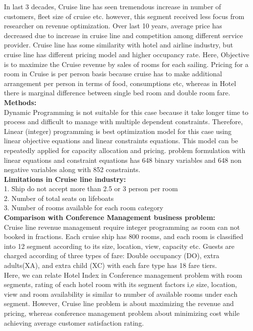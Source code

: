 \documentclass[paper=a4, fontsize=11pt]{scrartcl} %
\begin{document}
In last 3 decades, Cruise line has seen tremendous increase in number of customers, fleet size of cruise etc. however, this segment received less focus from researcher on revenue optimization. Over last 10 years, average price has decreased due to increase in cruise line and competition among different service provider. Cruise line has some similarity with hotel and airline industry, but cruise line has different pricing model and higher occupancy rate. Here, Objective is to maximize the Cruise revenue by sales of rooms for each sailing. Pricing for a room in Cruise is per person basis because cruise has to make additional arrangement per person in terms of food, consumptions etc, whereas in Hotel there is marginal difference between single bed room and double room fare. \\

\textbf{Methods:}\\
Dynamic Programming is not suitable for this case because it take longer time to process and difficult to manage with multiple dependent constraints. Therefore, Linear (integer) programming is best optimization model for this case using linear objective equations and linear constraints equations. This model can be repeatedly applied for capacity allocation and pricing. problem formulation with linear equations and constraint equations has 648 binary variables and 648 non negative variables along with 852 constraints.\\

\textbf{Limitations in Cruise line industry:}\\
1. Ship do not accept more than 2.5 or 3 person per room\\
2. Number of total seats on lifeboats\\
3. Number of rooms available for each room category\\

\textbf{Comparison with Conference Management business problem: }\\
Cruise line revenue management require integer programming as room can not booked in fractions. Each cruise ship has 800 rooms, and each room is classified into 12 segment according to its size, location, view, capacity etc. Guests are charged according of three types of fare: Double occupancy (DO), extra adults(XA), and extra child (XC) with each fare type has 18 fare tiers.\\

Here, we can relate Hotel Index in Conference management problem with room segments, rating of each hotel room with its segment factors i,e size, location, view and room availability is similar to number of available rooms under each segment. However, Cruise line problem is about maximizing the revenue and pricing, whereas conference management problem about minimizing cost while achieving average customer satisfaction rating.
\end{document}
